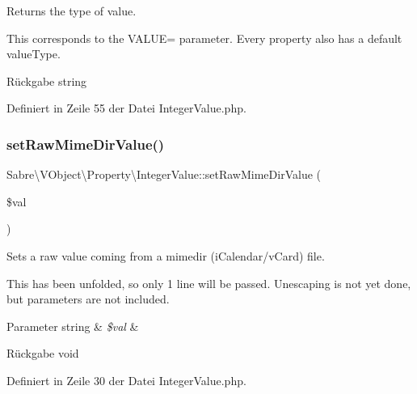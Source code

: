 Returns the type of value.

This corresponds to the V\+A\+L\+UE= parameter. Every property also has a \textquotesingle{}default\textquotesingle{} value\+Type.

\begin{DoxyReturn}{Rückgabe}
string 
\end{DoxyReturn}


Definiert in Zeile 55 der Datei Integer\+Value.\+php.

\mbox{\label{class_sabre_1_1_v_object_1_1_property_1_1_integer_value_acb60394cb1ecfb5b0b523601c05a8fdc}} 
\subsubsection{\texorpdfstring{set\+Raw\+Mime\+Dir\+Value()}{setRawMimeDirValue()}}
{\footnotesize\ttfamily Sabre\textbackslash{}\+V\+Object\textbackslash{}\+Property\textbackslash{}\+Integer\+Value\+::set\+Raw\+Mime\+Dir\+Value (\begin{DoxyParamCaption}\item[{}]{\$val }\end{DoxyParamCaption})}

Sets a raw value coming from a mimedir (i\+Calendar/v\+Card) file.

This has been \textquotesingle{}unfolded\textquotesingle{}, so only 1 line will be passed. Unescaping is not yet done, but parameters are not included.


\begin{DoxyParams}[1]{Parameter}
string & {\em \$val} & \\
\hline
\end{DoxyParams}
\begin{DoxyReturn}{Rückgabe}
void 
\end{DoxyReturn}


Definiert in Zeile 30 der Datei Integer\+Value.\+php.

\mbox{\label{class_sabre_1_1_v_object_1_1_property_1_1_integer_value_aa5764004cad757b839c18c7865911779}} 
